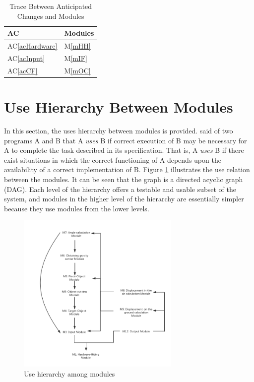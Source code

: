 \documentclass[12pt, titlepage]{article}
\newcommand{\acref}[1]{AC\ref{#1}}
\newcommand{\mref}[1]{M\ref{#1}}
\begin{document}
	\begin{table}[H]
		\centering
		\begin{tabular}{p{} p{}}
			\toprule
			\textbf{AC} & \textbf{Modules}\\
			\midrule
			\acref{acHardware} & \mref{mHH}\\
			\acref{acInput} & \mref{mIF}\\
			\acref{acCF} & \mref{mOC}\\
			\bottomrule
		\end{tabular}
		\caption{Trace Between Anticipated Changes and Modules}
		\label{TblACT}
	\end{table}
	
	\section{Use Hierarchy Between Modules} \label{SecUse}
	
	In this section, the uses hierarchy between modules is
	provided. \citet{Parnas1978} said of two programs A and B that A {\em uses} B if
	correct execution of B may be necessary for A to complete the task described in
	its specification. That is, A {\em uses} B if there exist situations in which
	the correct functioning of A depends upon the availability of a correct
	implementation of B.  Figure \ref{FigUH} illustrates the use relation between
	the modules. It can be seen that the graph is a directed acyclic graph
	(DAG). Each level of the hierarchy offers a testable and usable subset of the
	system, and modules in the higher level of the hierarchy are essentially simpler
	because they use modules from the lower levels.
	
	\begin{figure}[H]
		\centering
		\includegraphics[width=0.7\textwidth]{./Figure1.png}
		\caption{Use hierarchy among modules}
		\label{FigUH}
	\end{figure}
	
\end{document}
